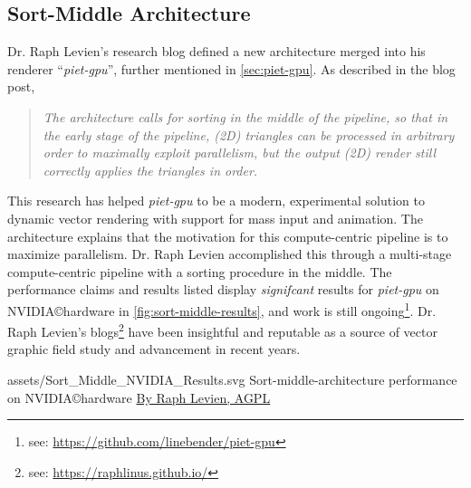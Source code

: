 \subsection{Sort-Middle Architecture}\cite{Levien20}
Dr. Raph Levien's research blog defined a new architecture merged into his renderer ``\textit{piet-gpu}'', further mentioned in \cref{sec:piet-gpu}. As described in the blog post,
\begin{quote}
\textit{The architecture calls for sorting in the middle of the pipeline, so that in the early stage of the pipeline, (2D) triangles can be processed in arbitrary order to maximally exploit parallelism, but the output (2D) render still correctly applies the triangles in order.}\cite{Levien20}
\end{quote}
This research has helped \textit{piet-gpu} to be a modern, experimental solution to dynamic vector rendering with support for mass input and animation. The architecture explains that the motivation for this compute-centric pipeline is to maximize parallelism. Dr. Raph Levien accomplished this through a multi-stage compute-centric pipeline with a sorting procedure in the middle. The performance claims and results listed display \emph{signifcant} results for \textit{piet-gpu} on NVIDIA\copyright hardware in \cref{fig:sort-middle-results}, and work is still ongoing\footnote{see: \href{https://github.com/linebender/piet-gpu}{https://github.com/linebender/piet-gpu}}. Dr. Raph Levien's blogs\footnote{see: \href{https://raphlinus.github.io/}{https://raphlinus.github.io/}} have been insightful and reputable as a source of vector graphic field study and advancement in recent years.\medskip

\widesvg
{assets/Sort_Middle_NVIDIA_Results.svg}
{Sort-middle-architecture performance on NVIDIA\copyright hardware\label{fig:sort-middle-results}}
{\href{http://www.gnu.org/licenses/agpl.html}{By Raph Levien, AGPL}}\medskip

